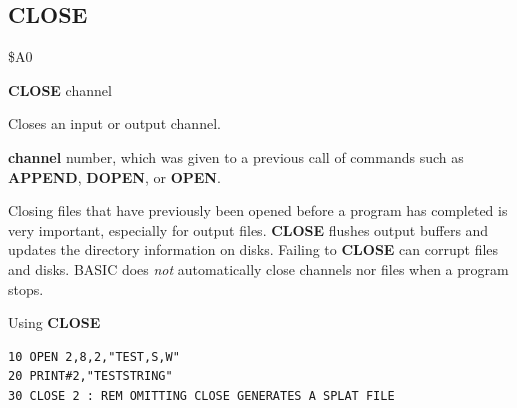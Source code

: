 \subsection{CLOSE}
\begin{description}[leftmargin=2cm,style=nextline]
\item [Token:] \$A0
\item [Format:] {\bf CLOSE} channel
\item [Usage:] Closes an input or output channel.

               {\bf channel} number, which was given to a previous
               call of commands such as {\bf APPEND}, {\bf DOPEN}, or {\bf OPEN}.

\item [Remarks:] Closing files that have previously been opened
               before a program has completed is
               very important, especially for output files.
               {\bf CLOSE} flushes output buffers and
               updates the directory information on disks.
               Failing to {\bf CLOSE} can corrupt files and disks.
               BASIC does {\em not} automatically close channels nor files
               when a program stops.

\item [Example:] Using {\bf CLOSE}
\begin{tcolorbox}[colback=black,coltext=white]
\verbatimfont{\codefont}
\begin{verbatim}
10 OPEN 2,8,2,"TEST,S,W"
20 PRINT#2,"TESTSTRING"
30 CLOSE 2 : REM OMITTING CLOSE GENERATES A SPLAT FILE
\end{verbatim}
\end{tcolorbox}
\end{description}


\newpage
